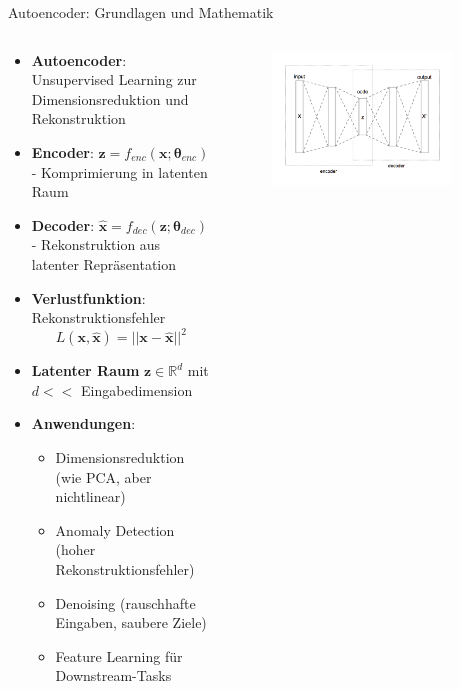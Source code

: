\documentclass[aspectratio=1610, xcolor=dvipsnames, 9pt]{beamer}
\begin{document}
      \begin{frame}{Autoencoder: Grundlagen und Mathematik}
        \begin{columns}
          \begin{column}{0.6\textwidth}
            \begin{itemize}
              \item \textbf{Autoencoder}: Unsupervised Learning zur Dimensionsreduktion und Rekonstruktion
              \item \textbf{Encoder}: $\mathbf{z} = f_{enc}(\mathbf{x}; \boldsymbol{\theta}_{enc})$ - Komprimierung in latenten Raum
              \item \textbf{Decoder}: $\hat{\mathbf{x}} = f_{dec}(\mathbf{z}; \boldsymbol{\theta}_{dec})$ - Rekonstruktion aus latenter Repräsentation
              \item \textbf{Verlustfunktion}: Rekonstruktionsfehler
              \begin{equation}
                L(\mathbf{x}, \hat{\mathbf{x}}) = ||\mathbf{x} - \hat{\mathbf{x}}||^2
              \end{equation}
              \item \textbf{Latenter Raum} $\mathbf{z} \in \mathbb{R}^d$ mit $d << $ Eingabedimension
              \item \textbf{Anwendungen}:
              \begin{itemize}
                \item Dimensionsreduktion (wie PCA, aber nichtlinear)
                \item Anomaly Detection (hoher Rekonstruktionsfehler)
                \item Denoising (rauschhafte Eingaben, saubere Ziele)
                \item Feature Learning für Downstream-Tasks
              \end{itemize}
            \end{itemize}
          \end{column}
           \begin{column}{0.4\textwidth}
             \begin{figure}
               \centering
                           \includegraphics[width=0.9\textwidth]{images/Autoencoder.png}

\end{figure}
\end{column}
\end{columns}
\end{frame}
\end{document}
